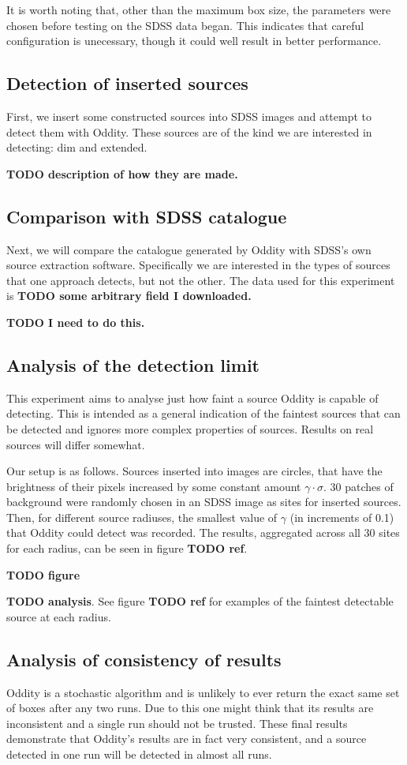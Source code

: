 \documentclass[manuscript]{aastex}
\newcommand{\TODO}[1]{\textbf{TODO #1}}
\begin{document}
It is worth noting that, other than the maximum box size, the parameters were chosen before testing on the SDSS data began. This indicates that careful configuration is unecessary, though it could well result in better performance.

\subsection{Detection of inserted sources}

First, we insert some constructed sources into SDSS images and attempt to detect them with Oddity. These sources are of the kind we are interested in detecting: dim and extended.

\TODO{description of how they are made.}

\subsection{Comparison with SDSS catalogue}

Next, we will compare the catalogue generated by Oddity with SDSS's own source extraction software. Specifically we are interested in the types of sources that one approach detects, but not the other. The data used for this experiment is \TODO{some arbitrary field I downloaded.}

\TODO{I need to do this.}

\subsection{Analysis of the detection limit}

This experiment aims to analyse just how faint a source Oddity is capable of detecting. This is intended as a general indication of the faintest sources that can be detected and ignores more complex properties of sources. Results on real sources will differ somewhat.

Our setup is as follows. Sources inserted into images are circles, that have the brightness of their pixels increased by some constant amount $\gamma \cdot \sigma$. 30 patches of background were randomly chosen in an SDSS image as sites for inserted sources. Then, for different source radiuses, the smallest value of $\gamma$ (in increments of 0.1) that Oddity could detect was recorded. The results, aggregated across all 30 sites for each radius, can be seen in figure \TODO{ref}.

\TODO{figure}

\TODO{analysis}. See figure \TODO{ref} for examples of the faintest detectable source at each radius.

\subsection{Analysis of consistency of results}

Oddity is a stochastic algorithm and is unlikely to ever return the exact same set of boxes after any two runs. Due to this one might think that its results are inconsistent and a single run should not be trusted. These final results demonstrate that Oddity's results are in fact very consistent, and a source detected in one run will be detected in almost all runs.
\end{document}
